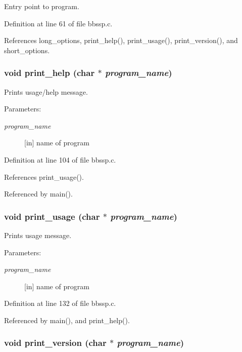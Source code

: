 Entry point to program. 



Definition at line 61 of file bbssp.c.

References long\_\-options, print\_\-help(), print\_\-usage(), print\_\-version(), and short\_\-options.\hypertarget{group__bbssp_gb090c3311cfe36c9908201e66e09a06b}{
\subsubsection{\setlength{\rightskip}{0pt plus 5cm}void print\_\-help (char $\ast$ {\em program\_\-name})}}
\label{group__bbssp_gb090c3311cfe36c9908201e66e09a06b}


Prints usage/help message. 

\begin{Desc}
\item[Parameters:]
\begin{description}
\item[{\em program\_\-name}]\mbox{[}in\mbox{]} name of program \end{description}
\end{Desc}


Definition at line 104 of file bbssp.c.

References print\_\-usage().

Referenced by main().\hypertarget{group__bbssp_g767128a69bdfad046920286832102a40}{
\subsubsection{\setlength{\rightskip}{0pt plus 5cm}void print\_\-usage (char $\ast$ {\em program\_\-name})}}
\label{group__bbssp_g767128a69bdfad046920286832102a40}


Prints usage message. 

\begin{Desc}
\item[Parameters:]
\begin{description}
\item[{\em program\_\-name}]\mbox{[}in\mbox{]} name of program \end{description}
\end{Desc}


Definition at line 132 of file bbssp.c.

Referenced by main(), and print\_\-help().\hypertarget{group__bbssp_g0e9eb03b516f80fc4b993ef37b334376}{
\subsubsection{\setlength{\rightskip}{0pt plus 5cm}void print\_\-version (char $\ast$ {\em program\_\-name})}}
\label{group__bbssp_g0e9eb03b516f80fc4b993ef37b334376}


